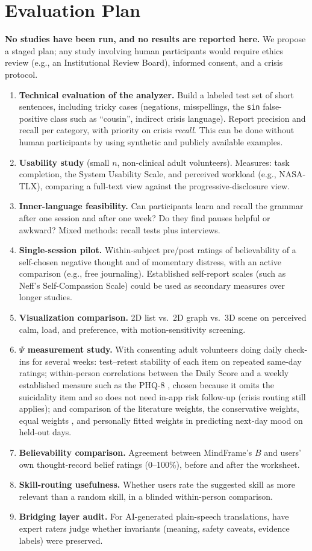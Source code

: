 \documentclass[11pt]{article}
\begin{document}
\section{Evaluation Plan}\label{sec:eval}
\textbf{No studies have been run, and no results are reported here.} We propose a staged plan; any study involving human participants would require ethics review (e.g., an Institutional Review Board), informed consent, and a crisis protocol.
\begin{enumerate}
\item \textbf{Technical evaluation of the analyzer.} Build a labeled test set of short sentences, including tricky cases (negations, misspellings, the \texttt{sin} false-positive class such as ``cousin'', indirect crisis language). Report precision and recall per category, with priority on crisis \emph{recall}. This can be done without human participants by using synthetic and publicly available examples.
\item \textbf{Usability study} (small $n$, non-clinical adult volunteers). Measures: task completion, the System Usability Scale, and perceived workload (e.g., NASA-TLX), comparing a full-text view against the progressive-disclosure view.
\item \textbf{Inner-language feasibility.} Can participants learn and recall the grammar after one session and after one week? Do they find pauses helpful or awkward? Mixed methods: recall tests plus interviews.
\item \textbf{Single-session pilot.} Within-subject pre/post ratings of believability of a self-chosen negative thought and of momentary distress, with an active comparison (e.g., free journaling). Established self-report scales (such as Neff's Self-Compassion Scale) could be used as secondary measures over longer studies.
\item \textbf{Visualization comparison.} 2D list vs.\ 2D graph vs.\ 3D scene on perceived calm, load, and preference, with motion-sensitivity screening.
\item \textbf{$\Psi$ measurement study.} With consenting adult volunteers doing daily check-ins for several weeks: test--retest stability of each item on repeated same-day ratings; within-person correlations between the Daily Score and a weekly established measure such as the PHQ-8 \citep{kroenke2009}, chosen because it omits the suicidality item and so does not need in-app risk follow-up (crisis routing still applies); and comparison of the literature weights, the conservative weights, equal weights \citep{dawes1979}, and personally fitted weights in predicting next-day mood on held-out days.
\item \textbf{Believability comparison.} Agreement between MindFrame's $B$ and users' own thought-record belief ratings (0--100\%), before and after the worksheet.
\item \textbf{Skill-routing usefulness.} Whether users rate the suggested skill as more relevant than a random skill, in a blinded within-person comparison.
\item \textbf{Bridging layer audit.} For AI-generated plain-speech translations, have expert raters judge whether invariants (meaning, safety caveats, evidence labels) were preserved.
\end{enumerate}
\end{document}
